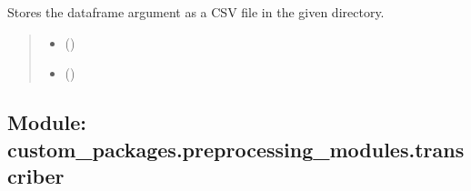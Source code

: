 \documentclass[letterpaper,10pt,english]{sphinxhowto}
\begin{document}
\begin{fulllineitems}
\label{\detokenize{_autosummary/custom_packages.preprocessing_modules.text_cleaning.store_as_csv:custom_packages.preprocessing_modules.text_cleaning.store_as_csv}}
\pysigstartsignatures
\pysiglinewithargsret
{}
{\sphinxparamcomma {}}
{}
\pysigstopsignatures
\sphinxAtStartPar
Stores the dataframe argument as a CSV file in the given directory.
\begin{quote}\begin{description}
\begin{itemize}
\item {} 
\sphinxAtStartPar
{} ()

\item {} 
\sphinxAtStartPar
{} ()

\end{itemize}

\sphinxAtStartPar
{}

\end{description}\end{quote}

\end{fulllineitems}



\subsection{Module: custom\_packages.preprocessing\_modules.transcriber}
\label{\detokenize{preprocessing_modules:module-custom-packages-preprocessing-modules-transcriber}}
\end{document}
